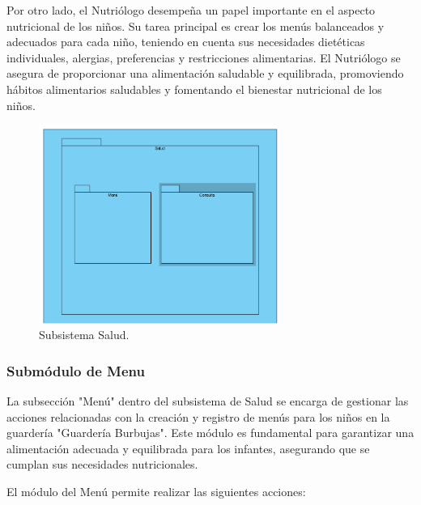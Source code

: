 Por otro lado, el Nutriólogo desempeña un papel importante en el aspecto nutricional de los niños. Su tarea principal es crear los menús balanceados y adecuados para cada niño, teniendo en cuenta sus necesidades dietéticas individuales, alergias, preferencias y restricciones alimentarias. El Nutriólogo se asegura de proporcionar una alimentación saludable y equilibrada, promoviendo hábitos alimentarios saludables y fomentando el bienestar nutricional de los niños.

\begin{figure}[htbp]
\centering
\includegraphics[width=0.7\textwidth]{images/arqui/subSalud.png}
\caption{Subsistema Salud.}
\label{fig:subsistsalud}
\end{figure}

\subsubsection{Submódulo de Menu}
La subsección "Menú" dentro del subsistema de Salud se encarga de gestionar las acciones relacionadas con la creación y registro de menús para los niños en la guardería "Guardería Burbujas". Este módulo es fundamental para garantizar una alimentación adecuada y equilibrada para los infantes, asegurando que se cumplan sus necesidades nutricionales.

El módulo del Menú permite realizar las siguientes acciones:

